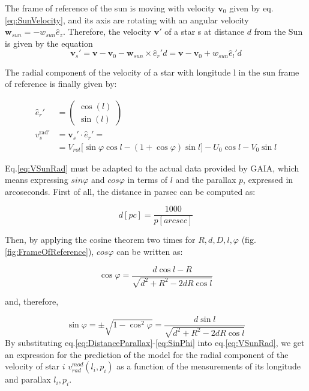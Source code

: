 \noindent
The frame of reference of the sun is moving with velocity $\bm{v}_0$ given by eq.\ref{eq:SunVelocity}, and its axis are rotating with an angular velocity $\bm{w}_{sun} = -w_{sun} \hat{e}_z$. Therefore, the velocity $\bm{v'}$ of a star s at distance $d$ from the Sun is given by the equation
\begin{equation}\label{eq:ReferenceFrame}
    \bm{v}_s' = \bm{v} - \bm{v}_0 - \bm{w}_{sun} \times \hat{e}_r' d = \bm{v} - \bm{v}_0 + w_{sun} \hat{e}_l' d
\end{equation}
\noindent 


\noindent 
The radial component of the velocity of a star with longitude l in the sun frame of reference is finally given by:

\begin{equation}\label{eq:VSunRad}
    \begin{aligned}
        \hat{e}_r' &= \begin{pmatrix} \cos(l) \\ \sin(l) \end{pmatrix} \\
        v_s^{\text{rad}'}  &= \bm{v}_s' \cdot \hat{e}_r' = \\ 
        &=V_{rot} \biggl[ \sin\varphi \cos l - (1 + \cos\varphi)\sin l \biggr] - U_0 \cos l - V_0 \sin l
    \end{aligned}
\end{equation}
\noindent




Eq.\ref{eq:VSunRad} must be adapted to the actual data provided by GAIA, which means expressing $sin\varphi$ and $cos\varphi$ in terms of $l$ and the parallax $p$, expressed in arcoseconds. First of all, the distance in parsec can be computed as:

\begin{equation}\label{eq:DistanceParallax}
    d[pc] = \frac{1000}{p[arcsec]}
\end{equation}

\noindent
Then, by applying the cosine theorem two times for $R, d, D, l, \varphi$ (fig.\ref{fig:FrameOfReference}), $cos\varphi$ can be written as:

\begin{equation}\label{eq:CosPhi}
    \cos\varphi = \frac{d \cos l - R}{\sqrt{d^2 + R^2 - 2dR \cos l}}
\end{equation}

\noindent
and, therefore,

\begin{equation}\label{eq:SinPhi}
    \sin\varphi = \pm \sqrt{1 - \cos^2 \varphi} = \frac{d\sin l}{\sqrt{d^2 + R^2 -2dR \cos l}}
\end{equation}
\noindent
By substituting eq.\ref{eq:DistanceParallax}-\ref{eq:SinPhi} into eq.\ref{eq:VSunRad}, we get an expression for the prediction of the model for the radial component of the velocity of star $i$ $v_{rad}^{mod}(l_i, p_i)$ as a function of the measurements of its longitude and parallax $l_i, p_i$.